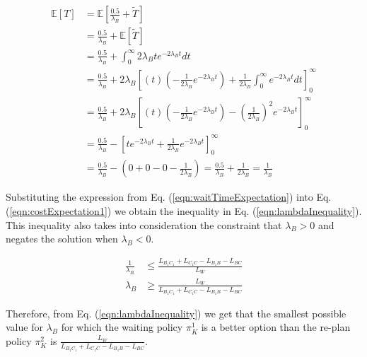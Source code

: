 \documentclass[a4paper,12pt]{article}
\begin{document}
			\begin{equation}
			\begin{split}
			\mathbb{E}\left[T\right] & = \mathbb{E}\left[\frac{0.5}{\lambda_{B}}+\widetilde{T}\right] \\
			& = \frac{0.5}{\lambda_{B}} + \mathbb{E}\left[\widetilde{T}\right] \\
			& = \frac{0.5}{\lambda_{B}} + \int_{0}^{\infty}2\lambda_{B}te^{-2\lambda_{B}t} dt \\
			& = \frac{0.5}{\lambda_{B}} + 2\lambda_{B}\left[\left(t\right) \left(-\frac{1}{2\lambda_{B}}e^{-2\lambda_{B}t}\right) + \frac{1}{2\lambda_{B}} \int_{0}^{\infty}e^{-2\lambda_{B}t} dt \right]_{0}^{\infty} \\
			& = \frac{0.5}{\lambda_{B}} + 2\lambda_{B}\left[\left(t\right) \left(-\frac{1}{2\lambda_{B}}e^{-2\lambda_{B}t}\right) - \left(\frac{1}{2\lambda_{B}}\right)^2 e^{-2\lambda_{B}t} \right]_{0}^{\infty} \\
			& = \frac{0.5}{\lambda_{B}} - \left[te^{-2\lambda_{B}t} + \frac{1}{2\lambda_{B}} e^{-2\lambda_{B}t} \right]_{0}^{\infty} \\
			& = \frac{0.5}{\lambda_{B}} - (0 + 0 - 0 - \frac{1}{2\lambda_{B}}) = \frac{0.5}{\lambda_{B}} + \frac{1}{2\lambda_{B}} = \frac{1}{\lambda_{B}}
			\end{split}
			\label{eqn:waitTimeExpectation}
			\end{equation}
			
			Substituting the expression from Eq. (\ref{eqn:waitTimeExpectation}) into Eq. (\ref{eqn:costExpectation1}) we obtain the inequality in Eq. (\ref{eqn:lambdaInequality}). This inequality also takes into consideration the constraint that $\lambda_{B} > 0$ and negates the solution when $\lambda_{B} < 0$.
			
			\begin{equation}
			\begin{split}
			\frac{1}{\lambda_{B}} & \leq \frac{L_{B_{1}C_{1}} + L_{C_{1}C} - L_{B_{1}B} - L_{BC}}{L_W} \\	
			\lambda_{B} & \geq \frac{L_W}{L_{B_{1}C_{1}} + L_{C_{1}C} - L_{B_{1}B} - L_{BC}}
			\end{split}
			\label{eqn:lambdaInequality}
			\end{equation}
			
			Therefore, from Eq. (\ref{eqn:lambdaInequality}) we get that the smallest possible value for $\lambda_{B}$ for which the waiting policy $\pi_K^1$ is a better option than the re-plan policy $\pi_K^2$ is $ \frac{L_W}{L_{B_{1}C_{1}} + L_{C_{1}C} - L_{B_{1}B} - L_{BC}} $.
		
\end{document}
